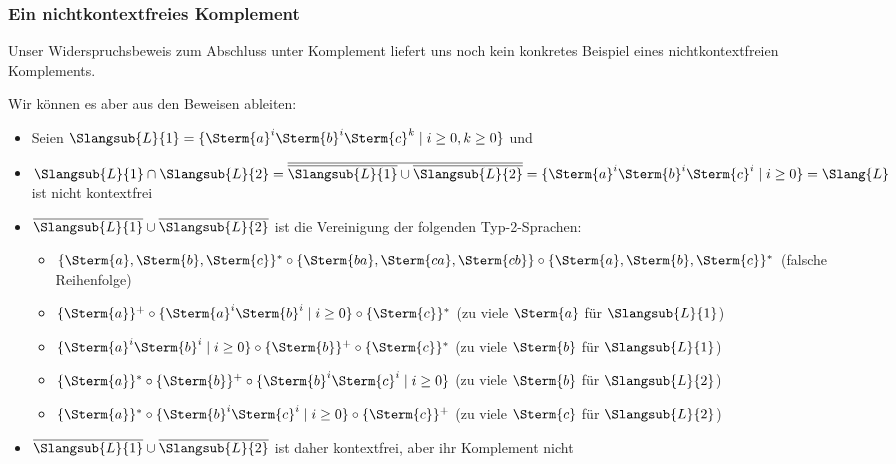 \documentclass[aspectratio=1610,onlymath]{beamer}
\begin{document}
\begin{frame}\frametitle{Ein nichtkontextfreies Komplement}

Unser Widerspruchsbeweis zum Abschluss unter Komplement liefert uns noch kein 
konkretes Beispiel eines nichtkontextfreien Komplements.\pause
\medskip

Wir können es aber aus den Beweisen ableiten:
\begin{itemize}
\item Seien $\Slangsub{L}{1}=\{\Sterm{a}^i\Sterm{b}^i\Sterm{c}^k\mid i\geq 0, k\geq 0\}$ 
und 
%
\item $\Slangsub{L}{1}\cap\Slangsub{L}{2}=\overline{\overline{\Slangsub{L}{1}}\cup\overline{\Slangsub{L}{2}}}=\{\Sterm{a}^i\Sterm{b}^i\Sterm{c}^i\mid i\geq 0\}=\Slang{L}$ ist nicht kontextfrei\pause
%
\item $\overline{\Slangsub{L}{1}}\cup\overline{\Slangsub{L}{2}}$ ist die Vereinigung der folgenden Typ-2-Sprachen:
\begin{itemize}
\item $\{\Sterm{a},\Sterm{b},\Sterm{c}\}^*\circ\{\Sterm{ba},\Sterm{ca},\Sterm{cb}\}\circ\{\Sterm{a},\Sterm{b},\Sterm{c}\}^*$ (falsche Reihenfolge)
\item $\{\Sterm{a}\}^+\circ \{\Sterm{a}^i\Sterm{b}^i\mid i\geq 0\}\circ\{\Sterm{c}\}^*$ \hspace{1.25cm}(zu viele $\Sterm{a}$ für $\Slangsub{L}{1}$)
\item $\{\Sterm{a}^i\Sterm{b}^i\mid i\geq 0\}\circ\{\Sterm{b}\}^+\circ\{\Sterm{c}\}^*$ \hspace{1.25cm}(zu viele $\Sterm{b}$ für $\Slangsub{L}{1}$)
\item $\{\Sterm{a}\}^*\circ\{\Sterm{b}\}^+\circ \{\Sterm{b}^i\Sterm{c}^i\mid i\geq 0\}$ \hspace{1.25cm}(zu viele $\Sterm{b}$ für $\Slangsub{L}{2}$)
\item $\{\Sterm{a}\}^*\circ \{\Sterm{b}^i\Sterm{c}^i\mid i\geq 0\}\circ\{\Sterm{c}\}^+$  \hspace{1.25cm}(zu viele $\Sterm{c}$ für $\Slangsub{L}{2}$)
\end{itemize}
%
\item $\overline{\Slangsub{L}{1}}\cup\overline{\Slangsub{L}{2}}$ ist daher kontextfrei, aber ihr Komplement nicht
\end{itemize}


\end{frame}
\end{document}
